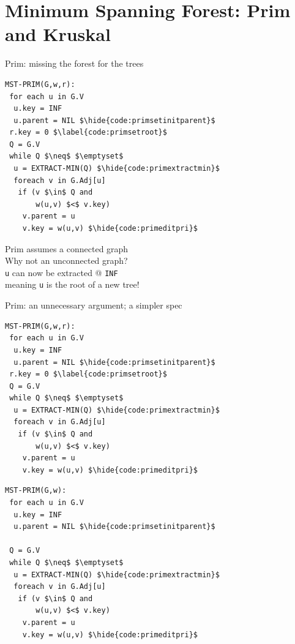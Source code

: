\documentclass[usenames, xcolor=dvipsnames]{beamer}
\newcommand{\hide}[1]{}
\begin{document}
\section{Minimum Spanning Forest: Prim and Kruskal}

\begin{frame}[fragile]{Prim: missing the forest for the trees}

\begin{minipage}{0.48\textwidth}
\begin{lstlisting}
MST-PRIM(G,w,r):
 for each u in G.V
  u.key = INF
  u.parent = NIL $\hide{code:primsetinitparent}$
 r.key = 0 $\label{code:primsetroot}$
 Q = G.V
 while Q $\neq$ $\emptyset$
  u = EXTRACT-MIN(Q) $\hide{code:primextractmin}$
  foreach v in G.Adj[u]
   if (v $\in$ Q and 
       w(u,v) $<$ v.key)
    v.parent = u
    v.key = w(u,v) $\hide{code:primeditpri}$
\end{lstlisting} \end{minipage}
\begin{minipage}{0.5\textwidth}
\pause
Prim assumes a connected graph \\
\bigskip \pause
Why not an unconnected graph? \\
\bigskip \pause
\texttt{u} can now be extracted @ \texttt{INF} \\ 
\bigskip \pause
meaning \texttt{u} is the root of a new tree!
\end{minipage}

\end{frame}

\begin{frame}[fragile]{Prim: an unnecessary argument; a simpler spec}

\begin{minipage}{0.48\textwidth}
\begin{lstlisting}
MST-PRIM(G,w,r):
 for each u in G.V
  u.key = INF
  u.parent = NIL $\hide{code:primsetinitparent}$
 r.key = 0 $\label{code:primsetroot}$
 Q = G.V
 while Q $\neq$ $\emptyset$
  u = EXTRACT-MIN(Q) $\hide{code:primextractmin}$
  foreach v in G.Adj[u]
   if (v $\in$ Q and 
       w(u,v) $<$ v.key)
    v.parent = u
    v.key = w(u,v) $\hide{code:primeditpri}$
\end{lstlisting} \end{minipage}
\begin{minipage}{0.5\textwidth}
\begin{lstlisting}
MST-PRIM(G,w):
 for each u in G.V
  u.key = INF
  u.parent = NIL $\hide{code:primsetinitparent}$

 Q = G.V
 while Q $\neq$ $\emptyset$
  u = EXTRACT-MIN(Q) $\hide{code:primextractmin}$
  foreach v in G.Adj[u]
   if (v $\in$ Q and 
       w(u,v) $<$ v.key)
    v.parent = u
    v.key = w(u,v) $\hide{code:primeditpri}$
\end{lstlisting} 
\end{minipage} 
\end{frame}
\end{document}
